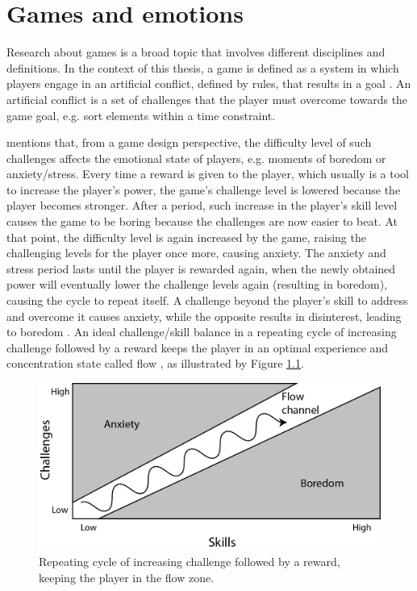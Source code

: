 \chapter{Games and emotions}

Research about games is a broad topic that involves different disciplines and definitions. In the context of this thesis, a game is defined as a system in which players engage in an artificial conflict, defined by rules, that results in a goal \parencite{salen2004rules}. An artificial conflict is a set of challenges that the player must overcome towards the game goal, e.g. sort elements within a time constraint.

\textcite{schell2014art} mentions that, from a game design perspective, the difficulty level of such challenges affects the emotional state of players, e.g. moments of boredom or anxiety/stress. Every time a reward is given to the player, which usually is a tool to increase the player's power, the game's challenge level is lowered because the player becomes stronger. After a period, such increase in the player's skill level causes the game to be boring because the challenges are now easier to beat. At that point, the difficulty level is again increased by the game, raising the challenging levels for the player once more, causing anxiety. The anxiety and stress period lasts until the player is rewarded again, when the newly obtained power will eventually lower the challenge levels again (resulting in boredom), causing the cycle to repeat itself. A challenge beyond the player's skill to address and overcome it causes anxiety, while the opposite results in disinterest, leading to boredom \parencite{chen2007flow}. An ideal challenge/skill balance in a repeating cycle of increasing challenge followed by a reward keeps the player in an optimal experience and concentration state called flow \parencite{csikszentmihalyi1991flow}, as illustrated by Figure \ref{fig:flow-schell}.

\begin{figure}[h!]
    \centering
    \includegraphics[scale=0.8]{figures/flow-schell.png}
    \caption{Repeating cycle of increasing challenge followed by a reward, keeping the player in the flow zone. \parencite{schell2014art}}
    \label{fig:flow-schell}
\end{figure}

